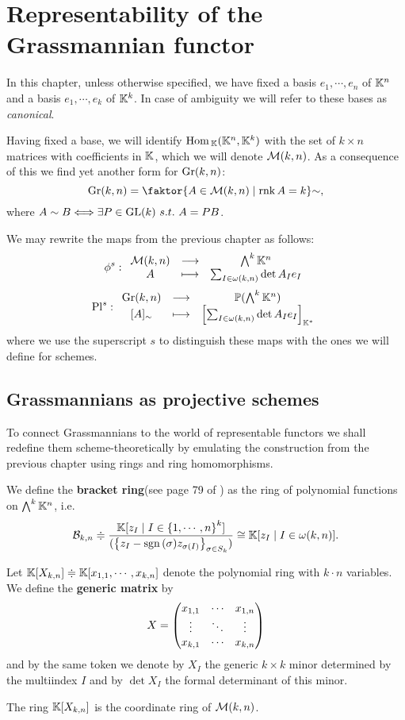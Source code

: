 \chapter{Representability of the Grassmannian functor}
In this chapter, unless otherwise specified, we have fixed a basis $e_1,\cdots, e_n$ of $\mathbb{K}^n$ and a basis $e_1,\cdots, e_k$ of $\mathbb{K}^k$. In case of ambiguity we will refer to these bases as \textit{canonical}.
\medskip

\noindent Having fixed a base, we will identify $\mathrm{Hom}\,_{\mathbb{K}}(\mathbb{K}^n,\mathbb{K}^k)$ with the set of $k\times n$ matrices with coefficients in $\mathbb{K}$, which we will denote $\mathcal{M}(k,n)$. As a consequence of this we find yet another form for $\mathrm{Gr}(k,n)$:
\[\Gr(k,n)=\quot{\cpa{A\in \Mc(k,n)\mid \rnk A=k}}{\sim},\] 
where $A\sim B\Longleftrightarrow \exists P\in \mathrm{GL}(k)\ s.t.\ A=PB$.
\bigskip

\noindent We may rewrite the maps from the previous chapter as follows:
\[\phi^s:\begin{array}{ccc} {\mathcal{M}(k,n)} & \longrightarrow & {\bigwedge^k\mathbb{K}^n}\\ {A} & \longmapsto & {\sum_{I\in \omega(k,n)}\det A_I e_I} \end{array}\]
\[\mathrm{Pl}^s:\begin{array}{ccc} {\mathrm{Gr}(k,n)} & \longrightarrow & {\mathbb{P}(\bigwedge^k\mathbb{K}^n)}\\ {[A]_\sim} & \longmapsto & {\left[{\sum_{I\in \omega(k,n)}\det A_I e_I}\right]_{\mathbb{K}^\ast}} \end{array}\]
where we use the superscript $s$ to distinguish these maps with the ones we will define for schemes.

\section{Grassmannians as projective schemes}
To connect Grassmannians to the world of representable functors we shall redefine them scheme-theoretically by emulating the construction from the previous chapter using rings and ring homomorphisms.

\begin{definition}
We define the \textbf{bracket ring}(see page 79 of \cite{matroids}) as the ring of polynomial functions on $\bigwedge^k\mathbb{K}^n$, i.e.
\[\mathcal{B}_{k,n}\doteqdot\frac{\mathbb{K}[z_I\mid I\in \left\{{1,\cdots, n}\right\}^k]}{(\left\{{z_I-\mathrm{sgn}\,(\sigma)z_{\sigma(I)}}\right\}_{\sigma\in S_k})}\cong \mathbb{K}[z_I\mid I\in \omega(k,n)].\]
\end{definition}

\begin{definition}
Let $\mathbb{K}[X_{k,n}]\doteqdot\mathbb{K}[x_{1,1},\cdots,x_{k,n}]$ denote the polynomial ring with $k\cdot n$ variables. We define the \textbf{generic matrix} by
\[X=\begin{pmatrix}
    x_{1,1} & \cdots & x_{1,n}\\
    \vdots & \ddots & \vdots\\
    x_{k,1} &\cdots & x_{k,n}\end{pmatrix}\]
and by the same token we denote by $X_I$ the generic $k\times k$ minor determined by the multiindex $I$ and by $\det X_I$ the formal determinant of this minor.
\end{definition}
\begin{remark}
The ring $\mathbb{K}[X_{k,n}]$ is the coordinate ring of $\mathcal{M}(k,n)$. 
\end{remark}

